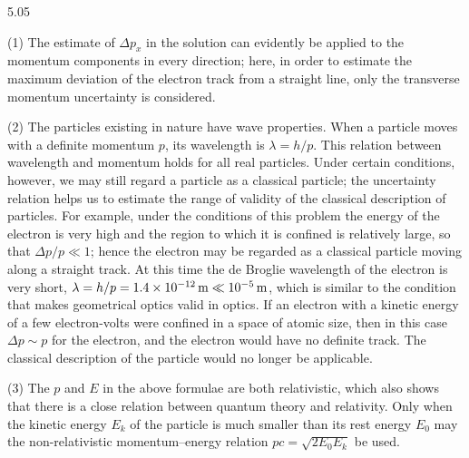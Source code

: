 \begin{solution}{5.05}
\begin{commentary}
(1) The estimate of $\Delta p_x$ in the solution can evidently be applied to the momentum
components in every direction; here, in order to estimate the maximum deviation of the
electron track from a straight line, only the transverse momentum uncertainty is considered.

(2) The particles existing in nature have wave properties. When a particle moves with a
definite momentum $p$, its wavelength is $\lambda = h/p$. This relation between wavelength and
momentum holds for all real particles. Under certain conditions, however, we may still regard
a particle as a classical particle; the uncertainty relation helps us to estimate the range of
validity of the classical description of particles. For example, under the conditions of this
problem the energy of the electron is very high and the region to which it is confined is
relatively large, so that $\Delta p/p \ll 1$; hence the electron may be regarded as a classical
particle moving along a straight track. At this time the de Broglie wavelength of the electron
is very short, $\lambda = h/p = 1.4\times 10^{-12}\,\mathrm{m} \ll 10^{-5}\,\mathrm{m}$, which is
similar to the condition that makes geometrical optics valid in optics. If an electron with a
kinetic energy of a few electron-volts were confined in a space of atomic size, then in this
case $\Delta p \sim p$ for the electron, and the electron would have no definite track. The
classical description of the particle would no longer be applicable.

(3) The $p$ and $E$ in the above formulae are both relativistic, which also shows that there
is a close relation between quantum theory and relativity. Only when the kinetic energy $E_k$
of the particle is much smaller than its rest energy $E_0$ may the non-relativistic
momentum--energy relation $pc = \sqrt{2E_0E_k}$ be used.
\end{commentary}
\end{solution}

